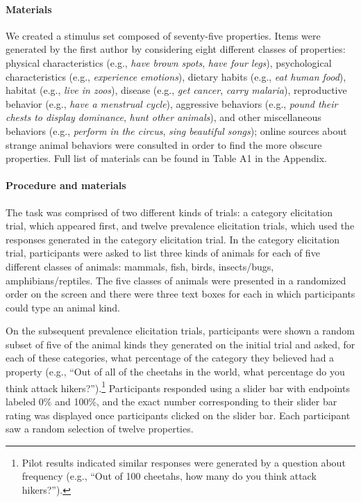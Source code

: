\documentclass[floatsintext,doc]{apa6}
\let\oldparagraph\paragraph
\renewcommand{\paragraph}[1]{\oldparagraph{#1}\mbox{}}
\let\rmarkdownfootnote\footnote%
\def\footnote{\protect\rmarkdownfootnote}
\begin{document}
\hypertarget{materials}{%
\paragraph{Materials}\label{materials}}
We created a stimulus set composed of seventy-five properties.
Items were generated by the first author by considering eight different classes of properties: physical characteristics (e.g., \emph{have brown spots}, \emph{have four legs}), psychological characteristics (e.g., \emph{experience emotions}), dietary habits (e.g., \emph{eat human food}), habitat (e.g., \emph{live in zoos}), disease (e.g., \emph{get cancer}, \emph{carry malaria}), reproductive behavior (e.g., \emph{have a menstrual cycle}), aggressive behaviors (e.g., \emph{pound their chests to display dominance}, \emph{hunt other animals}), and other miscellaneous behaviors (e.g., \emph{perform in the circus}, \emph{sing beautiful songs}); online sources about strange animal behaviors were consulted in order to find the more obscure properties. Full list of materials can be found in Table A1 in the Appendix.

\hypertarget{procedure-and-materials-1}{%
\paragraph{Procedure and materials}\label{procedure-and-materials-1}}
The task was comprised of two different kinds of trials: a category elicitation trial, which appeared first, and twelve prevalence elicitation trials, which used the responses generated in the category elicitation trial.
In the category elicitation trial, participants were asked to list three kinds of animals for each of five different classes of animals: mammals, fish, birds, insects/bugs, amphibians/reptiles.
The five classes of animals were presented in a randomized order on the screen and there were three text boxes for each in which participants could type an animal kind.

On the subsequent prevalence elicitation trials, participants were shown a random subset of five of the animal kinds they generated on the initial trial and asked, for each of these categories, what percentage of the category they believed had a property (e.g., \enquote{Out of all of the cheetahs in the world, what percentage do you think attack hikers?}).\footnote{Pilot results indicated similar responses were generated by a question about frequency (e.g., \enquote{Out of 100 cheetahs, how many do you think attack hikers?}).} 
Participants responded using a slider bar with endpoints labeled 0\% and 100\%, and the exact number corresponding to their slider bar rating was displayed once participants clicked on the slider bar.
Each participant saw a random selection of twelve properties.
\end{document}
